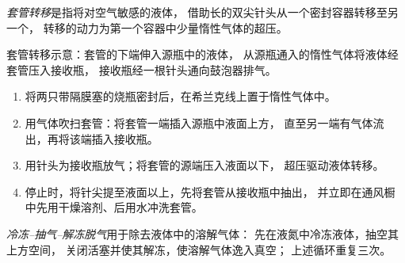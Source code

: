 \begin{definition}[套管转移]\label{def:b3:lab-techniques-3:cannula}
\emph{套管转移}是指将对空气敏感的液体，
借助长的双尖针头从一个密封容器转移至另一个，
转移的动力为第一个容器中少量惰性气体的超压。
\end{definition}

\begin{omfigure}

{\small 套管转移示意：套管的下端伸入源瓶中的液体，
从源瓶通入的惰性气体将液体经套管压入接收瓶，
接收瓶经一根针头通向鼓泡器排气。}
\end{omfigure}

\begin{method}[套管转移]\label{met:b3:lab-techniques-3:cannula}
\begin{enumerate}
  \item 将两只带隔膜塞的烧瓶密封后，在希兰克线上置于惰性气体中。
  \item 用气体吹扫套管：将套管一端插入源瓶中液面上方，
        直至另一端有气体流出，再将该端插入接收瓶。
  \item 用针头为接收瓶放气；将套管的源端压入液面以下，
        超压驱动液体转移。
  \item 停止时，将针尖提至液面以上，先将套管从接收瓶中抽出，
        并立即在通风橱中先用干燥溶剂、后用水冲洗套管。
\end{enumerate}
\end{method}

\begin{definition}[冷冻–抽气–解冻脱气]\label{def:b3:lab-techniques-3:degassing}
\emph{冷冻–抽气–解冻脱气}用于除去液体中的溶解气体：
先在液氮中冷冻液体，抽空其上方空间，
关闭活塞并使其解冻，使溶解气体逸入真空；
上述循环重复三次。
\end{definition}

